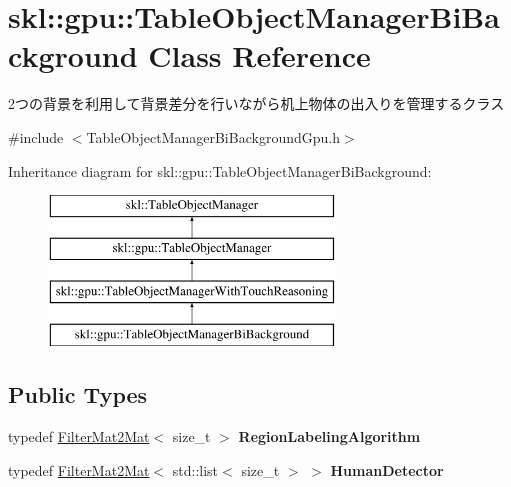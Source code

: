 \hypertarget{classskl_1_1gpu_1_1_table_object_manager_bi_background}{}\section{skl\+:\+:gpu\+:\+:Table\+Object\+Manager\+Bi\+Background Class Reference}
\label{classskl_1_1gpu_1_1_table_object_manager_bi_background}


2つの背景を利用して背景差分を行いながら机上物体の出入りを管理するクラス  




{\ttfamily \#include $<$Table\+Object\+Manager\+Bi\+Background\+Gpu.\+h$>$}

Inheritance diagram for skl\+:\+:gpu\+:\+:Table\+Object\+Manager\+Bi\+Background\+:\begin{figure}[H]
\begin{center}
\leavevmode
\includegraphics[height=4.000000cm]{classskl_1_1gpu_1_1_table_object_manager_bi_background}
\end{center}
\end{figure}
\subsection*{Public Types}
\begin{DoxyCompactItemize}
\item 
\hypertarget{classskl_1_1gpu_1_1_table_object_manager_bi_background_ab1cc00e9b9e4de283b2dd468b2a465ae}{}\label{classskl_1_1gpu_1_1_table_object_manager_bi_background_ab1cc00e9b9e4de283b2dd468b2a465ae} 
typedef \hyperlink{classskl_1_1_filter_mat2_mat}{Filter\+Mat2\+Mat}$<$ size\+\_\+t $>$ {\bfseries Region\+Labeling\+Algorithm}
\item 
\hypertarget{classskl_1_1gpu_1_1_table_object_manager_bi_background_a3f09b4d75c73ac8a41fe38789305a188}{}\label{classskl_1_1gpu_1_1_table_object_manager_bi_background_a3f09b4d75c73ac8a41fe38789305a188} 
typedef \hyperlink{classskl_1_1_filter_mat2_mat}{Filter\+Mat2\+Mat}$<$ std\+::list$<$ size\+\_\+t $>$ $>$ {\bfseries Human\+Detector}
\end{DoxyCompactItemize}
